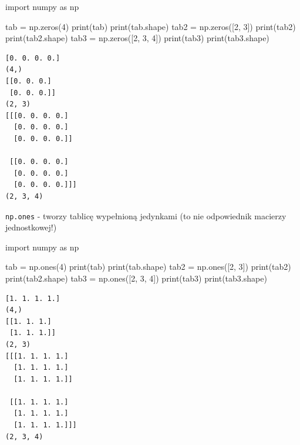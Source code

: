 \documentclass[
  polish,
  letterpaper,
  DIV=11,
  numbers=noendperiod]{scrreprt}
\newenvironment{Shaded}{\begin{snugshade}}{\end{snugshade}}
\newcommand{\BuiltInTok}[1]{\textcolor[rgb]{0.00,0.23,0.31}{#1}}
\newcommand{\DecValTok}[1]{\textcolor[rgb]{0.68,0.00,0.00}{#1}}
\newcommand{\ImportTok}[1]{\textcolor[rgb]{0.00,0.46,0.62}{#1}}
\newcommand{\NormalTok}[1]{\textcolor[rgb]{0.00,0.23,0.31}{#1}}
\newcommand{\OperatorTok}[1]{\textcolor[rgb]{0.37,0.37,0.37}{#1}}
\begin{document}
\begin{Shaded}
\begin{Highlighting}[]
\ImportTok{import}\NormalTok{ numpy }\ImportTok{as}\NormalTok{ np}

\NormalTok{tab }\OperatorTok{=}\NormalTok{ np.zeros(}\DecValTok{4}\NormalTok{)}
\BuiltInTok{print}\NormalTok{(tab)}
\BuiltInTok{print}\NormalTok{(tab.shape)}
\NormalTok{tab2 }\OperatorTok{=}\NormalTok{ np.zeros([}\DecValTok{2}\NormalTok{, }\DecValTok{3}\NormalTok{])}
\BuiltInTok{print}\NormalTok{(tab2)}
\BuiltInTok{print}\NormalTok{(tab2.shape)}
\NormalTok{tab3 }\OperatorTok{=}\NormalTok{ np.zeros([}\DecValTok{2}\NormalTok{, }\DecValTok{3}\NormalTok{, }\DecValTok{4}\NormalTok{])}
\BuiltInTok{print}\NormalTok{(tab3)}
\BuiltInTok{print}\NormalTok{(tab3.shape)}
\end{Highlighting}
\end{Shaded}

\begin{verbatim}
[0. 0. 0. 0.]
(4,)
[[0. 0. 0.]
 [0. 0. 0.]]
(2, 3)
[[[0. 0. 0. 0.]
  [0. 0. 0. 0.]
  [0. 0. 0. 0.]]

 [[0. 0. 0. 0.]
  [0. 0. 0. 0.]
  [0. 0. 0. 0.]]]
(2, 3, 4)
\end{verbatim}

\texttt{np.ones} - tworzy tablicę wypełnioną jedynkami (to nie
odpowiednik macierzy jednostkowej!)

\begin{Shaded}
\begin{Highlighting}[]
\ImportTok{import}\NormalTok{ numpy }\ImportTok{as}\NormalTok{ np}

\NormalTok{tab }\OperatorTok{=}\NormalTok{ np.ones(}\DecValTok{4}\NormalTok{)}
\BuiltInTok{print}\NormalTok{(tab)}
\BuiltInTok{print}\NormalTok{(tab.shape)}
\NormalTok{tab2 }\OperatorTok{=}\NormalTok{ np.ones([}\DecValTok{2}\NormalTok{, }\DecValTok{3}\NormalTok{])}
\BuiltInTok{print}\NormalTok{(tab2)}
\BuiltInTok{print}\NormalTok{(tab2.shape)}
\NormalTok{tab3 }\OperatorTok{=}\NormalTok{ np.ones([}\DecValTok{2}\NormalTok{, }\DecValTok{3}\NormalTok{, }\DecValTok{4}\NormalTok{])}
\BuiltInTok{print}\NormalTok{(tab3)}
\BuiltInTok{print}\NormalTok{(tab3.shape)}
\end{Highlighting}
\end{Shaded}

\begin{verbatim}
[1. 1. 1. 1.]
(4,)
[[1. 1. 1.]
 [1. 1. 1.]]
(2, 3)
[[[1. 1. 1. 1.]
  [1. 1. 1. 1.]
  [1. 1. 1. 1.]]

 [[1. 1. 1. 1.]
  [1. 1. 1. 1.]
  [1. 1. 1. 1.]]]
(2, 3, 4)
\end{verbatim}
\end{document}
